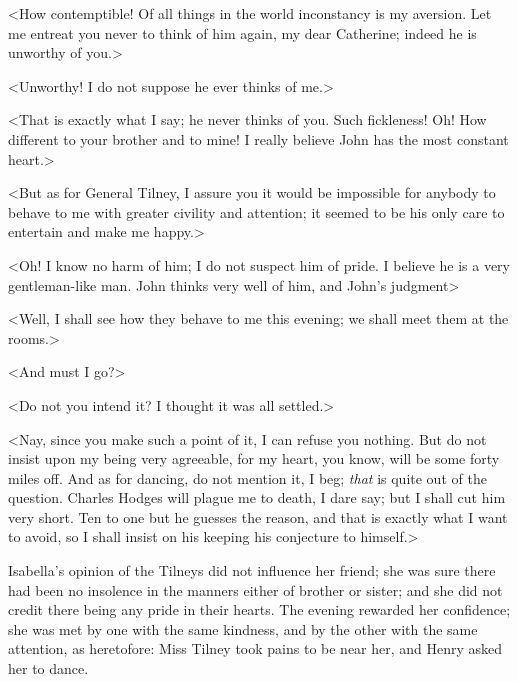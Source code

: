  <How contemptible! Of all things in the world inconstancy is my aversion. Let me entreat you never to think of him again, my dear Catherine; indeed he is unworthy of you.> 

 <Unworthy! I do not suppose he ever thinks of me.> 

 <That is exactly what I say; he never thinks of you. Such fickleness! Oh! How different to your brother and to mine! I really believe John has the most constant heart.> 

 <But as for General Tilney, I assure you it would be impossible for anybody to behave to me with greater civility and attention; it seemed to be his only care to entertain and make me happy.> 

 <Oh! I know no harm of him; I do not suspect him of pride. I believe he is a very gentleman-like man. John thinks very well of him, and John's judgment\longdash> 

 <Well, I shall see how they behave to me this evening; we shall meet them at the rooms.> 

 <And must I go?> 

 <Do not you intend it? I thought it was all settled.> 

 <Nay, since you make such a point of it, I can refuse you nothing. But do not insist upon my being very agreeable, for my heart, you know, will be some forty miles off. And as for dancing, do not mention it, I beg; \textit{that} is quite out of the question. Charles Hodges will plague me to death, I dare say; but I shall cut him very short. Ten to one but he guesses the reason, and that is exactly what I want to avoid, so I shall insist on his keeping his conjecture to himself.> 

 Isabella's opinion of the Tilneys did not influence her friend; she was sure there had been no insolence in the manners either of brother or sister; and she did not credit there being any pride in their hearts. The evening rewarded her confidence; she was met by one with the same kindness, and by the other with the same attention, as heretofore: Miss Tilney took pains to be near her, and Henry asked her to dance. 

